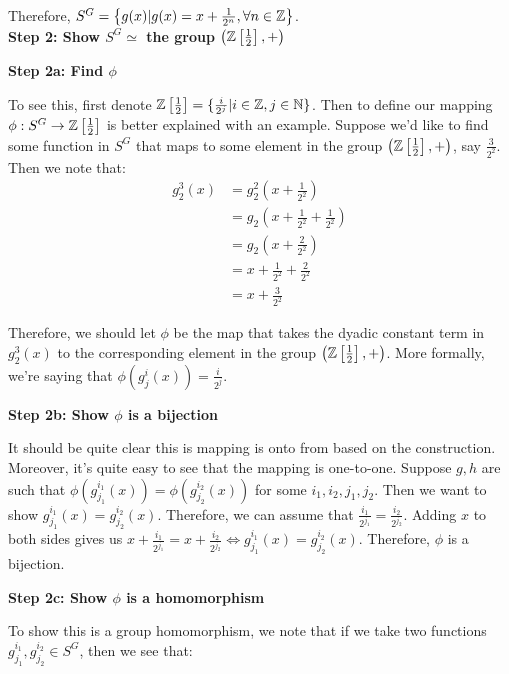 Therefore, $S^G=\left\{g(x)|g(x)=x+\frac{1}{2^{n}}, \forall n\in \mathbb{Z}\right\}$.\\

\textbf{Step 2: Show $S^G\simeq$  the group $\left(\mathbb{Z}\left[\frac{1}{2}\right],+\right)$}

\textbf{Step 2a: Find $\phi$}

To see this, first denote $\mathbb{Z}\left[\frac{1}{2}\right]=\{ \frac{i}{2^j} | i \in \mathbb{Z}, j \in \mathbb{N} \}$. Then to define our mapping $\phi:S^G \rightarrow \mathbb{Z}\left[\frac{1}{2}\right]$ is better explained with an example. Suppose we'd like to find some function in $S^G$  that maps to some element in the group $\left(\mathbb{Z}\left[\frac{1}{2}\right],+\right)$, say $\frac{3}{2^2}$. Then we note that:
\begin{align*}
g_2^3(x)
&=g_2^2(x+\frac{1}{2^2})\\
&=g_2(x+\frac{1}{2^2}+\frac{1}{2^2})\\
&=g_2(x+\frac{2}{2^2})\\
&=x+\frac{1}{2^2}+\frac{2}{2^2}\\
&=x+\frac{3}{2^2}
\end{align*}

Therefore, we should let $\phi$ be the map that takes the dyadic constant term in  $g_2^3(x)$ to the corresponding element in the group $\left(\mathbb{Z}\left[\frac{1}{2}\right],+\right)$. More formally, we're saying that $\phi(g_j^i(x))=\frac{i}{2^j}$. 

\textbf{Step 2b: Show $\phi$ is a bijection}

It should be quite clear this is mapping is onto from based on the construction. Moreover, it's quite easy to see that the mapping is one-to-one. Suppose $g,h$ are such that $\phi(g_{j_1}^{i_1}(x))=\phi(g_{j_2}^{i_2}(x))$ for some $i_1,i_2,j_1,j_2$. Then we want to show $g_{j_1}^{i_1}(x)=g_{j_2}^{i_2}(x)$. Therefore, we can assume that $\frac{i_1}{2^{j_1}}=\frac{i_2}{2^{j_2}}$. Adding $x$ to both sides gives us  $x+\frac{i_1}{2^{j_1}}=x+\frac{i_2}{2^{j_2}}\Leftrightarrow g_{j_1}^{i_1}(x)=g_{j_2}^{i_2}(x)$. Therefore, $\phi$ is a bijection. 

\textbf{Step 2c: Show $\phi$ is a homomorphism}

To show this is a group homomorphism, we note that if we take two functions $g_{j_1}^{i_1}, g_{j_2}^{i_2} \in S^G$, then we see that:

